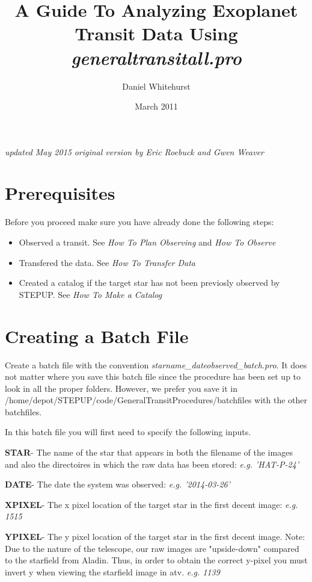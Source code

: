 \documentclass[10pt,preprint]{aastex}
\begin{document}
\title{A Guide To Analyzing Exoplanet Transit Data Using \textit{generaltransitall.pro}}
\author{Daniel Whitehurst}
\date{March 2011}
\emph{updated May 2015}
\emph{original version by Eric Roebuck and Gwen Weaver}

\tableofcontents
\clearpage


\section{Prerequisites}

Before you proceed make sure you have already done the following steps:

\begin{itemize}
\item Observed a transit. 
	See \emph{How To Plan Observing} and \emph{How To Observe} 
\item Transfered the data. 
	See \emph{How To Transfer Data}
\item Created a catalog if the target star has not been previosly observed by STEPUP.
	See \emph{How To Make a Catalog}
\end{itemize}

\section{Creating a Batch File}

Create a batch file with the convention \emph{starname\_dateobserved\_batch.pro}. It does not matter
 where you save this batch file since the procedure has been set up to look in all the proper 
folders. However, we prefer you save it in /home/depot/STEPUP/code/GeneralTransitProcedures/batchfiles with the other batchfiles.

In this batch file you will first need to specify the following inputs.

\textbf{STAR}- 
The name of the star that appears in both the filename of the images and also the directoires in which the raw data has been stored: \emph{e.g. 'HAT-P-24'}

\textbf{DATE}-
 The date the system was observed: \emph{e.g. '2014-03-26'}

\textbf{XPIXEL}- 
The x pixel location of the target star in the first decent image: \emph{e.g. 1515}

\textbf{YPIXEL}- 
The y pixel location of the target star in the first decent image. Note: Due to the nature of the telescope, our raw images are "upside-down" compared to the starfield from Aladin. Thus, in order to obtain the correct y-pixel you must invert y when viewing the starfield image in atv. \emph{e.g. 1139}
\end{document}
